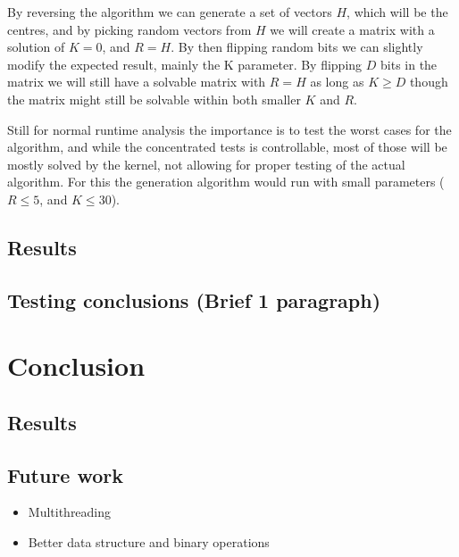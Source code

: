 \documentclass[a4paper]{article}
\begin{document}


By reversing the algorithm we can generate a set of vectors $H$, which will be the centres, 
and by picking random vectors from $H$ we will create a matrix with a solution of $K=0$, 
and $R=H$. By then flipping random bits we can slightly modify the expected result, mainly 
the K parameter. By flipping $D$ bits in the matrix we will still have a solvable matrix 
with $R = H$ as long as $K \geq D$ though the matrix might still be solvable within both 
smaller $K$ and $R$.

Still for normal runtime analysis the importance is to test the worst cases for the algorithm, 
and while the concentrated tests is controllable, most of those will be mostly solved by the 
kernel, not allowing for proper testing of the actual algorithm. For this the generation 
algorithm would run with small parameters ($R \leq 5$, and $K \leq 30$).

\subsection{Results}
\subsection{Testing conclusions (Brief 1 paragraph)}

%
%
\newpage

\section{Conclusion}
\subsection{Results}
\subsection{Future work}
\begin{itemize}
    \item Multithreading
    \item Better data structure and binary operations
\end{itemize}





%
%
\newpage


\end{document}
